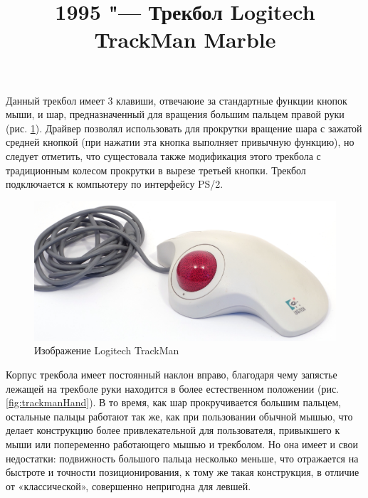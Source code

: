\documentclass[11pt, a4paper]{article}
\begin{document}
\title{1995 "--- Трекбол Logitech TrackMan Marble}
\date{}
\maketitle

Данный трекбол имеет 3 клавиши, отвечаюие за стандартные функции кнопок мыши, и шар, предназначенный для вращения большим пальцем правой руки (рис. \ref{fig:trackman}). Драйвер позволял использовать для прокрутки вращение шара с зажатой средней кнопкой (при нажатии эта кнопка выполняет привычную функцию), но следует отметить, что сущестовала также модификация этого трекбола с традиционным колесом прокрутки в вырезе третьей кнопки.
Трекбол подключается к компьютеру по интерфейсу PS/2.

\begin{figure}[h]
    \centering
    \includegraphics[scale=0.4]{1995_logitech_trackman/pic_60.jpg}
    \caption{Изображение Logitech TrackMan}
    \label{fig:trackman}
\end{figure}

Корпус трекбола имеет постоянный наклон вправо, благодаря чему запястье лежащей на трекболе руки находится в более естественном положении (рис. \ref{fig:trackmanHand}). В то время, как шар прокручивается большим пальцем, остальные пальцы работают так же, как при пользовании обычной мышью, что делает конструкцию более привлекательной для пользователя, привыкшего к мыши или попеременно работающего мышью и трекболом. Но она имеет и свои недостатки: подвижность большого пальца несколько меньше, что отражается на быстроте и точности позиционирования, к тому же такая конструкция, в отличие от «классической», совершенно непригодна для левшей.
\end{document}
